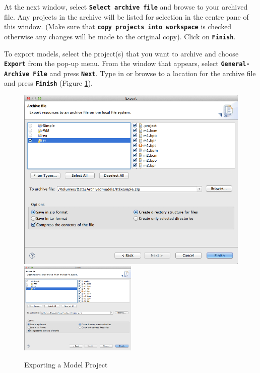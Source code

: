 At the next window, select \textbf{\texttt{Select archive file}} and browse to your archived file. Any projects in the archive will be listed for selection in the centre pane of this window. (Make sure that \textbf{\texttt{copy projects into workspace}} is checked otherwise any changes will be made to the original copy). Click on \textbf{\texttt{Finish}}.


To export models, select the project(s) that you want to archive and choose \textbf{\texttt{Export}} from the pop-up menu. From the window that appears, select \textbf{\texttt{General-Archive File}} and press \textbf{\texttt{Next}}. Type in or browse to a location for the archive file and press \textbf{\texttt{Finish}} (Figure \ref{fig:ExportingaModelProject}).
 
\begin{figure}[!htbp]
  \centering
  \ifplastex
  \includegraphics[width=512]{figures/image3.png}
  \else
  \includegraphics[width=0.5\textwidth]{figures/image3.png}
  \fi
  \caption{Exporting a Model Project}
  \label{fig:ExportingaModelProject}
\end{figure}

